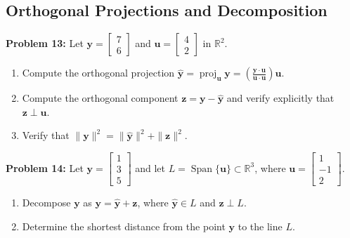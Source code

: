 \documentclass[11pt, letterpaper]{article}
\theoremstyle{definition}
\theoremstyle{remark}
\begin{document}
\subsection{Orthogonal Projections and Decomposition}

\textbf{Problem 13:} Let $\mathbf{y} = \begin{bmatrix} 7 \\ 6 \end{bmatrix}$ and $\mathbf{u} = \begin{bmatrix} 4 \\ 2 \end{bmatrix}$ in $\mathbb{R}^2$.
\begin{enumerate}[label=(\alph*)]
    \item Compute the orthogonal projection $\hat{\mathbf{y}} = \operatorname{proj}_{\mathbf{u}}\mathbf{y} = \left(\frac{\mathbf{y}\cdot\mathbf{u}}{\mathbf{u}\cdot\mathbf{u}}\right)\mathbf{u}$.
    \item Compute the orthogonal component $\mathbf{z} = \mathbf{y} - \hat{\mathbf{y}}$ and verify explicitly that $\mathbf{z} \perp \mathbf{u}$.
    \item Verify that $\|\mathbf{y}\|^2 = \|\hat{\mathbf{y}}\|^2 + \|\mathbf{z}\|^2$.
\end{enumerate}

\textbf{Problem 14:} Let $\mathbf{y} = \begin{bmatrix} 1 \\ 3 \\ 5 \end{bmatrix}$ and let $L = \operatorname{Span}\{\mathbf{u}\} \subset \mathbb{R}^3$, where $\mathbf{u} = \begin{bmatrix} 1 \\ -1 \\ 2 \end{bmatrix}$.
\begin{enumerate}[label=(\alph*)]
    \item Decompose $\mathbf{y}$ as $\mathbf{y} = \hat{\mathbf{y}} + \mathbf{z}$, where $\hat{\mathbf{y}} \in L$ and $\mathbf{z} \perp L$.
    \item Determine the shortest distance from the point $\mathbf{y}$ to the line $L$.
\end{enumerate}
\end{document}
